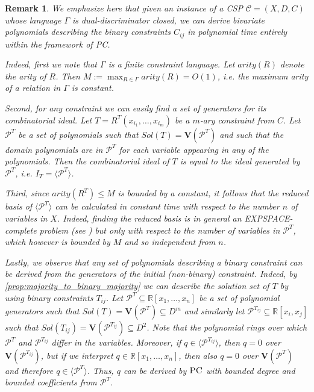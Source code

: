 \documentclass[11pt]{article}
\newcommand{\Cc}{\mathcal{C}}
\newcommand{\PC}{\textsc{PC}}
\newcommand{\Variety}[1]{{\textbf{V}}\left( #1 \right)}
\newcommand{\1}{\textbf{1}}
\newcommand{\GB}{\text{Gr\"{o}bner} }
\newtheorem{remark}[theorem]{Remark}
\begin{document}
\begin{remark} \label{rmrk:binary_constraints_bounded_derivations} 
    We emphasize here that given an instance of a CSP $\Cc = (X,D,C)$ whose language $\Gamma$ is dual-discriminator closed, we can derive bivariate polynomials describing the binary constraints $C_{ij}$ in polynomial time entirely within the framework of \PC. 
    
    Indeed, first we note that $\Gamma$ is a \emph{finite} constraint language. Let $arity(R)$ denote the arity of $R$. Then $M := \max_{R \in \Gamma} arity(R) = O(1)$, i.e. the maximum arity of a relation in $\Gamma$ is constant. 
    
    Second, for any constraint we can easily find a set of generators for its combinatorial ideal. Let $T = R^{T}(x_{i_1}, \ldots, x_{i_m})$ be a $m$-ary constraint from $C$. Let $\mathcal{P}^{T}$ be a set of polynomials such that $Sol(T) = \Variety{\mathcal{P}^{T}}$ and such that the domain polynomials are in $\mathcal{P}^{T}$ for each variable appearing in any of the polynomials. Then the combinatorial ideal of $T$ is equal to the ideal generated by $\mathcal{P}^{T}$, i.e. $I_T = \langle \mathcal{P}^{T} \rangle$. 
    
    Third, since $arity(R^{T}) \leq M$ is bounded by a constant, it follows that the reduced \GB basis of $\langle \mathcal{P}^{T} \rangle$ can be calculated in constant time with respect to the number $n$ of variables in $X$. Indeed, finding the reduced \GB basis is in general an EXPSPACE-complete problem (see \cite{MAYR1982305, Mayr1989}) but only with respect to the number of variables in $\mathcal{P}^{T}$, which however is bounded by $M$ and so independent from $n$.

    Lastly, we observe that any set of polynomials describing a binary constraint can be derived from the generators of the initial (non-binary) constraint. Indeed, by \cref{prop:majority_to_binary_majority} we can describe the solution set of $T$ by using binary constraints $T_{ij}$. Let $\mathcal{P}^{T} \subseteq \mathbb{R}[x_1, \dots, x_n]$ be a set of polynomial generators such that $Sol(T) = \Variety{\mathcal{P}^{T}} \subseteq D^m$ and similarly let $\mathcal{P}^{T_{ij}} \subseteq \mathbb{R}[x_i,x_j]$ such that $Sol(T_{ij}) = \Variety{\mathcal{P}^{T_{ij}}} \subseteq D^2$. Note that the polynomial rings over which $\mathcal{P}^{T}$ and $\mathcal{P}^{T_{ij}}$ differ in the variables. Moreover, if $q \in \langle \mathcal{P}^{T_{ij}} \rangle$, then $q = 0$ over $\Variety{\mathcal{P}^{T_{ij}}}$, but if we interpret $q \in \mathbb{R}[x_1, \dots, x_n]$, then also $q = 0$ over $\Variety{\mathcal{P}^{T}}$ and therefore $q \in \langle \mathcal{P}^{T} \rangle$. Thus, $q$ can be derived by $\PC$ with bounded degree and bounded coefficients from $\mathcal{P}^{T}$.


\end{remark}
\end{document}
